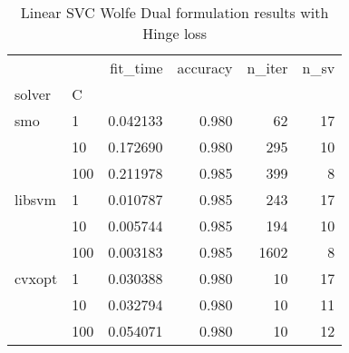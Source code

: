 \begin{table}[H]
\centering
\caption{Linear SVC Wolfe Dual formulation results with Hinge loss}
\label{linear_dual_l1_svc_cv_results}
\begin{tabular}{llrrrr}
\toprule
       &     &  fit\_time &  accuracy &  n\_iter &  n\_sv \\
solver & C &           &           &         &       \\
\midrule
smo & 1   &  0.042133 &     0.980 &      62 &    17 \\
       & 10  &  0.172690 &     0.980 &     295 &    10 \\
       & 100 &  0.211978 &     0.985 &     399 &     8 \\
libsvm & 1   &  0.010787 &     0.985 &     243 &    17 \\
       & 10  &  0.005744 &     0.985 &     194 &    10 \\
       & 100 &  0.003183 &     0.985 &    1602 &     8 \\
cvxopt & 1   &  0.030388 &     0.980 &      10 &    17 \\
       & 10  &  0.032794 &     0.980 &      10 &    11 \\
       & 100 &  0.054071 &     0.980 &      10 &    12 \\
\bottomrule
\end{tabular}
\end{table}
